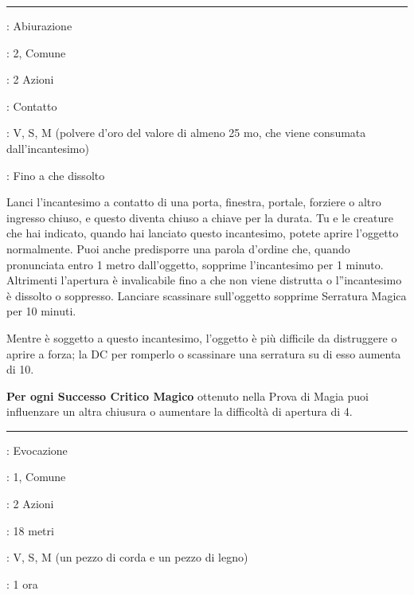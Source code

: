 \begin{multicols}{2}
\smallskip\noindent\rule{\linewidth}{2pt} \hypertarget{Serratura Magica}{}\smallskip{}\label{Arcane Lock}
\noindent
\begin{description}[noitemsep, topsep=0pt, parsep=0pt, partopsep=0pt, leftmargin=0cm, labelwidth=2.8cm]
	\item[\textbf{Lista di Magia}]: Abiurazione
	\item[\textbf{Livello}]: 2, Comune
	\item[\textbf{T. di Lancio}]: 2 Azioni
	\item[\textbf{Gittata}]: Contatto
	\item[\textbf{Componenti}]: V, S, M (polvere d'oro del valore di almeno 25 mo, che viene consumata dall'incantesimo)
	\item[\textbf{Durata}]: Fino a che dissolto
\end{description}

Lanci l'incantesimo a contatto di una porta, finestra, portale, forziere o altro ingresso chiuso, e questo diventa chiuso a chiave per la durata. Tu e le creature che hai indicato, quando hai lanciato questo incantesimo, potete aprire l'oggetto normalmente. Puoi anche predisporre una parola d'ordine che, quando pronunciata entro 1 metro dall'oggetto, sopprime l'incantesimo per 1 minuto. Altrimenti l'apertura è invalicabile fino a che non viene distrutta o l''incantesimo è dissolto o soppresso. Lanciare scassinare sull'oggetto sopprime Serratura Magica per 10 minuti.

Mentre è soggetto a questo incantesimo, l'oggetto è più difficile da distruggere o aprire a forza; la DC per romperlo o scassinare una serratura su di esso aumenta di 10.

\textbf{Per ogni Successo Critico Magico} ottenuto nella Prova di Magia puoi influenzare un altra chiusura o aumentare la difficoltà di apertura di 4.

\smallskip\noindent\rule{\linewidth}{2pt} \hypertarget{Servitore Invisibile}{}\smallskip{}
\noindent
\begin{description}[noitemsep, topsep=0pt, parsep=0pt, partopsep=0pt, leftmargin=0cm, labelwidth=2.8cm]
	\item[\textbf{Lista di Magia}]: Evocazione
	\item[\textbf{Livello}]: 1, Comune
	\item[\textbf{T. di Lancio}]: 2 Azioni
	\item[\textbf{Gittata}]: 18 metri
	\item[\textbf{Componenti}]: V, S, M (un pezzo di corda e un pezzo di legno)
	\item[\textbf{Durata}]: 1 ora
\end{description}


\end{multicols}
